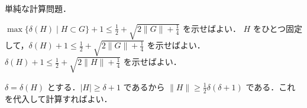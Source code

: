 \subsection{}
単純な計算問題．

$\max\{\delta(H)\mid H\subset G\} + 1 \leq \frac12 + \sqrt{2\|G\|+\frac14}$ を示せばよい．
$H$ をひとつ固定して，$\delta(H) + 1\leq \frac12 + \sqrt{2\|G\|+\frac14}$ を示せばよい．
$\delta(H) + 1\leq \frac12 + \sqrt{2\|H\|+\frac14}$ を示せばよい．

$\delta = \delta(H)$ とする．$|H|\geq \delta + 1$ であるから $\|H\|\geq \frac12\delta(\delta+1)$ である．これを代入して計算すればよい．